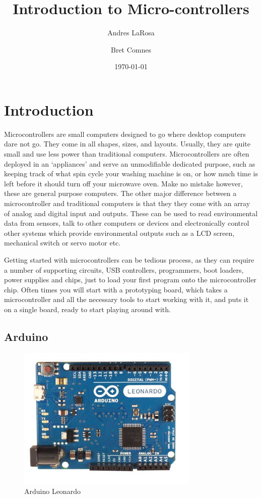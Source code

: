 \documentclass[11pt,a4paper]{article}
\begin{document}
\title{Introduction to Micro-controllers}
\date{\today} 
\author{Andres LaRosa}
\author{Bret Comnes}
\maketitle

\section{Introduction} %
\label{sec:introduction}

Microcontrollers are small computers designed to go where desktop computers dare not go.  They come in all shapes, sizes, and layouts.  Usually, they are quite small and use less power than traditional computers.  Microcontrollers are often deployed in an `appliances' and serve an unmodifiable dedicated purpose, such as keeping track of what spin cycle your washing machine is on, or how much time is left before it should turn off your microwave oven.  Make no mistake however, these are general purpose computers.  The other major difference between a microcontroller and traditional computers is that they they come with an array of analog and digital input and outputs. These can be used to read environmental data from sensors, talk to other computers or devices and electronically control other systems which provide environmental outputs such as a LCD screen, mechanical switch or servo motor etc.  \cite{wpmicro}

Getting started with microcontrollers can be tedious process, as they can require a number of supporting circuits, USB controllers, programmers, boot loaders, power supplies and chips, just to load your first program onto the microcontroller chip.  Often times you will start with a prototyping board, which takes a microcontroller and all the necessary tools to start working with it, and puts it on a single board, ready to start playing around with.

\subsection{Arduino} %
\label{sub:arduino}

\begin{figure}[htbp]
	\centering
		\includegraphics[height=2.7in]{figures/ArduinoLeonardoFront_2_450px.jpg}
	\caption{Arduino Leonardo\cite{leonardo}}
	\label{fig:figures_ArduinoLeonardoFront_2_450px}
\end{figure}
\end{document}
